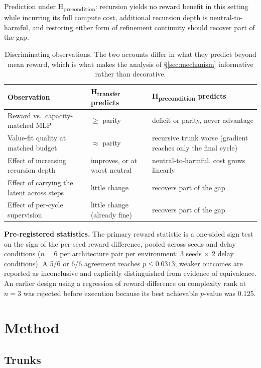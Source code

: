\documentclass[11pt]{article}
\begin{document}
Prediction under H\textsubscript{precondition}: recursion yields no reward benefit in this setting while incurring its full compute cost, additional recursion depth is neutral-to-harmful, and restoring either form of refinement continuity should recover part of the gap.

\begin{table}[h]
\centering
\small
\begin{tabular}{p{}p{}p{}}
\toprule
Observation & H\textsubscript{transfer} predicts & H\textsubscript{precondition} predicts \\
\midrule
Reward vs.\ capacity-matched MLP & $\geq$ parity & deficit or parity, never advantage \\
Value-fit quality at matched budget & ${\approx}$ parity & recursive trunk worse (gradient reaches only the final cycle) \\
Effect of increasing recursion depth & improves, or at worst neutral & neutral-to-harmful, cost grows linearly \\
Effect of carrying the latent across steps & little change & recovers part of the gap \\
Effect of per-cycle supervision & little change (already fine) & recovers part of the gap \\
\bottomrule
\end{tabular}
\caption{Discriminating observations. The two accounts differ in what they predict beyond mean reward, which is what makes the analysis of \S\ref{sec:mechanism} informative rather than decorative.}
\end{table}

\textbf{Pre-registered statistics.} The primary reward statistic is a one-sided sign test on the sign of the per-seed reward difference, pooled across seeds and delay conditions ($n=6$ per architecture pair per environment: 3 seeds $\times$ 2 delay conditions). A 5/6 or 6/6 agreement reaches $p \leq 0.0313$; weaker outcomes are reported as inconclusive and explicitly distinguished from evidence of equivalence. An earlier design using a regression of reward difference on complexity rank at $n=3$ was rejected before execution because its best achievable $p$-value was 0.125.

\section{Method}

\subsection{Trunks}
\end{document}
